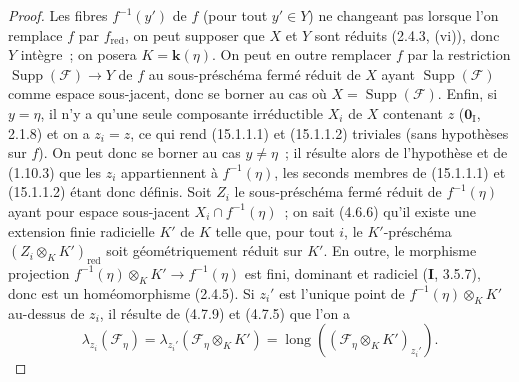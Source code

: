 \begin{proof}
Les fibres $f^{-1}(y')$ de $f$ (pour tout $y'\in Y$) ne changeant pas lorsque
l'on remplace $f$ par $f_{\mathrm{red}}$, on peut supposer que $X$ et $Y$ sont
réduits (2.4.3, (vi)), donc $Y$ intègre~; on posera
$K=\mathbf{k}(\eta)$. On peut en outre remplacer $f$ par la restriction
$\operatorname{Supp}(\mathcal F)\to Y$ de $f$ au sous-préschéma fermé réduit de
$X$ ayant $\operatorname{Supp}(\mathcal F)$ comme espace sous-jacent, donc se
borner au cas où $X=\operatorname{Supp}(\mathcal F)$. Enfin, si $y=\eta$, il n'y
a qu'une seule composante irréductible $X_i$ de $X$ contenant $z$
($\mathbf{0}_{\mathrm I}$, 2.1.8) et on a $z_i=z$, ce qui rend (15.1.1.1) et
(15.1.1.2) triviales (sans hypothèses sur $f$). On peut donc se borner au cas
$y\ne\eta$~; il résulte alors de l'hypothèse et de (1.10.3) que les $z_i$
appartiennent à $f^{-1}(\eta)$, les seconds membres de (15.1.1.1) et
(15.1.1.2) étant donc définis. Soit $Z_i$ le sous-préschéma fermé réduit de
$f^{-1}(\eta)$ ayant pour espace sous-jacent $X_i\cap f^{-1}(\eta)$~; on sait
(4.6.6) qu'il existe une extension finie radicielle $K'$ de $K$ telle que, pour
tout $i$, le $K'$-préschéma $(Z_i\otimes_K K')_{\mathrm{red}}$ soit
géométriquement réduit sur $K'$. En outre, le morphisme projection
$f^{-1}(\eta)\otimes_K K'\to f^{-1}(\eta)$ est fini, dominant et radiciel
(\textbf{I}, 3.5.7), donc est un homéomorphisme (2.4.5). Si $z_i'$ est l'unique
point de $f^{-1}(\eta)\otimes_K K'$ au-dessus de $z_i$, il résulte de (4.7.9) et
(4.7.5) que l'on a
\[
\tag{15.1.1.3}
\label{IV.15.1.1.3-fr}
  \lambda_{z_i}(\mathcal F_\eta)
  =\lambda_{z_i'}(\mathcal F_\eta\otimes_K K')
  =\operatorname{long}((\mathcal F_\eta\otimes_K K')_{z_i'}).
\]


\end{proof}
